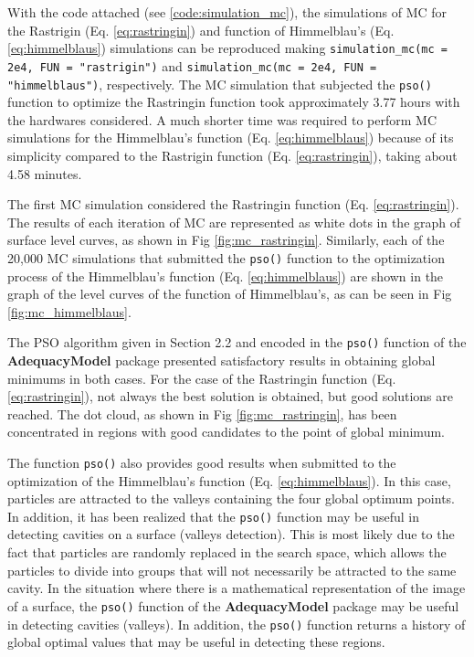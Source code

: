 \documentclass[10pt,letterpaper]{article}
\begin{document}
With the code attached (see \ref{code:simulation_mc}), the simulations of MC for the Rastrigin (Eq. \ref{eq:rastringin}) and function of Himmelblau's (Eq. \ref{eq:himmelblaus}) simulations can be reproduced making \texttt{simulation\_mc(mc = 2e4, FUN = "rastrigin")} and \texttt{simulation\_mc(mc = 2e4, FUN = "himmelblaus")}, respectively. The MC simulation that subjected the \texttt{pso()} function to optimize the Rastringin function took approximately 3.77 hours with the hardwares considered. A much shorter time was required to perform MC simulations for the Himmelblau's function (Eq. \ref{eq:himmelblaus}) because of its simplicity compared to the Rastrigin function (Eq. \ref{eq:rastringin}), taking about 4.58 minutes.

The first MC simulation considered the Rastringin function (Eq. \ref{eq:rastringin}). The results of each iteration of MC are represented as white dots in the graph of surface level curves, as shown in Fig \ref{fig:mc_rastringin}. Similarly, each of the 20,000 MC simulations that submitted the \texttt{pso()} function to the optimization process of the Himmelblau's function (Eq. \ref{eq:himmelblaus}) are shown in the graph of the level curves of the function of Himmelblau's, as can be seen in Fig \ref{fig:mc_himmelblaus}.

The PSO algorithm given in Section 2.2 and encoded in the \texttt{pso()} function of the \textbf{AdequacyModel} package presented satisfactory results in obtaining global minimums in both cases. For the case of the Rastringin function (Eq. \ref{eq:rastringin}), not always the best solution is obtained, but good solutions are reached. The dot cloud, as shown in Fig \ref{fig:mc_rastringin}, has been concentrated in regions with good candidates to the point of global minimum.

The function \texttt{pso()} also provides good results when submitted to the optimization of the Himmelblau's function (Eq. \ref{eq:himmelblaus}). In this case, particles are attracted to the valleys containing the four global optimum points. In addition, it has been realized that the \texttt{pso()} function may be useful in detecting cavities on a surface (valleys detection). This is most likely due to the fact that particles are randomly replaced in the search space, which allows the particles to divide into groups that will not necessarily be attracted to the same cavity. In the situation where there is a mathematical representation of the image of a surface, the \texttt{pso()} function of the \textbf{AdequacyModel} package may be useful in detecting cavities (valleys). In addition, the \texttt{pso()} function returns a history of global optimal values that may be useful in detecting these regions.
\end{document}
